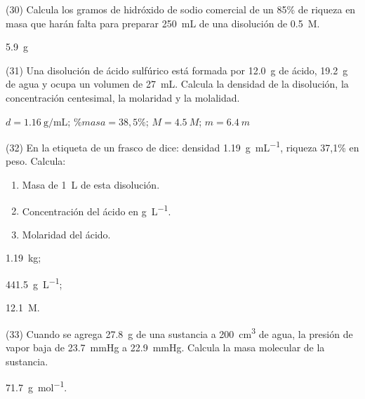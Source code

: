 \documentclass[10pt]{article}
\begin{document}
\begin{multicols}{2}
\begin{exercise}
  (30) Calcula los gramos de hidróxido de sodio comercial de un
  85\% de riqueza en masa que harán falta para preparar \SI{250}{\milli\liter} de una disolución de  \SI{0.5}{M}.
\end{exercise}
\begin{solution}
\SI{5.9}{\gram}
\end{solution}

\begin{exercise}
  (31) Una disolución de ácido sulfúrico está formada por \SI{12.0}{\gram} de
  ácido, \SI{19.2}{\gram} de agua y ocupa un volumen de \SI{27}{\milli\liter}. Calcula la densidad de la disolución, la concentración centesimal, la molaridad y la molalidad.
\end{exercise}
\begin{solution}
  \( d = \SI{1.16}{\gram\per\milli\liter} \); \( \%masa= 38,5\% \); \( M= \SI{4.5}{M} \); \( m= \SI{6.4}{m} \)
\end{solution}

\begin{exercise}
  (32) En la etiqueta de un frasco de  dice: densidad \SI{1.19}{\gram\per\milli\liter}, riqueza 37,1\% en peso. Calcula:
  \begin{enumerate}
    \item Masa de \SI{1}{\liter} de esta disolución.
    \item Concentración del ácido en \si{\gram\per\liter}.
    \item Molaridad del ácido.
  \end{enumerate}
\end{exercise}
\begin{solution}
  \begin{enumerate*}
    \item \SI{1,19}{\kilo\gram};
    \item \SI{441,5}{\gram\per\liter};
    \item \SI{12,1}{M}.
  \end{enumerate*}
\end{solution}

\begin{exercise}
  (33) Cuando se agrega \SI{27.8}{\gram} de una sustancia a \SI{200}{\cubic\centi\meter} de agua, la presión de vapor baja de \SI{23.7}{\mmHg} a \SI{22.9}{\mmHg}. Calcula la masa molecular de la sustancia.
\end{exercise}
\begin{solution}
  \SI{71.7}{\gram\per\mole}.
\end{solution}


\end{multicols}
\end{document}
